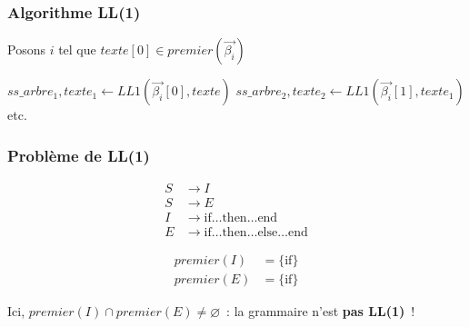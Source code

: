 \begin{frame}[fragile]
    \addtocounter{algocf}{-1}
    \frametitle{Algorithme LL(1)}

    \begin{algorithm}[H]
        \setcounter{AlgoLine}{7}
        \DontPrintSemicolon


        Posons $i$ tel que $texte[0] \in premier(\overrightarrow{\beta_i})$\;

        $ss\_arbre_1, texte_1 \gets LL1(\overrightarrow{\beta_i}[0], texte)$\;
        $ss\_arbre_2, texte_2 \gets LL1(\overrightarrow{\beta_i}[1], texte_1)$\;
        etc.\;

        \;

        \caption{LL(1)}
    \end{algorithm}

    \addtocounter{framenumber}{-1}
\end{frame}

\begin{frame}[fragile]
    \frametitle{Problème de LL(1)}

    \begin{align*}
        S & \to I                                                              \\
        S & \to E                                                              \\
        I & \to \text{if} \dots \text{then} \dots \text{end}                   \\
        E & \to \text{if} \dots \text{then} \dots \text{else} \dots \text{end}
    \end{align*}

    \pause

    \begin{align*}
        premier(I) & = \{\text{if}\} \\
        premier(E) & = \{\text{if}\}
    \end{align*}

    Ici, $premier(I) \cap premier(E) \ne \varnothing$~: la grammaire n’est
    \textbf{pas LL(1)}~!
\end{frame}

